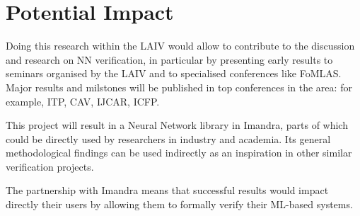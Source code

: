 \documentclass[]{article}
\begin{document}
\section{Potential Impact}
Doing this research within the LAIV would allow to contribute to the discussion and research on NN verification, in particular by presenting early results to seminars organised by the LAIV and to specialised conferences like FoMLAS. Major results and milstones will be published in top conferences in the area: for example, ITP, CAV, IJCAR, ICFP.

This project will result in a Neural Network library in Imandra, parts of which could be directly used by researchers in industry and academia. Its general methodological findings can be used indirectly as an inspiration in other similar verification projects. 

The partnership with Imandra means that successful results would impact directly their users by allowing them to formally verify their ML-based systems.

 

\end{document}
